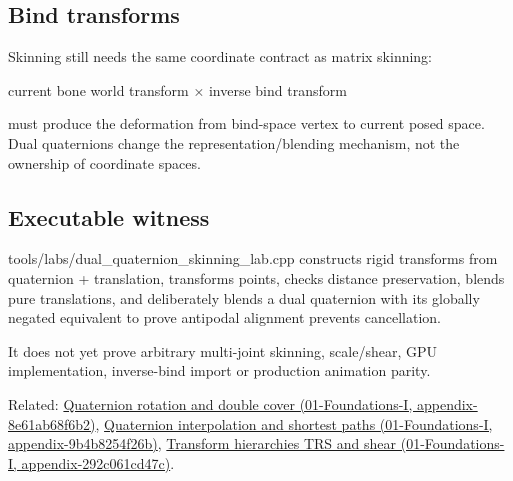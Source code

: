 \subsection{Bind transforms}\label{appendix-921f3f2efb53-bind-transforms}

Skinning still needs the same coordinate contract as matrix skinning:

current bone world transform × inverse bind transform

must produce the deformation from bind-space vertex to current posed space. Dual quaternions change the representation/blending mechanism, not the ownership of coordinate spaces.

\subsection{Executable witness}\label{appendix-921f3f2efb53-executable-witness}

tools/labs/dual\_quaternion\_skinning\_lab.cpp constructs rigid transforms from quaternion + translation, transforms points, checks distance preservation, blends pure translations, and deliberately blends a dual quaternion with its globally negated equivalent to prove antipodal alignment prevents cancellation.

It does not yet prove arbitrary multi-joint skinning, scale/shear, GPU implementation, inverse-bind import or production animation parity.

Related: \href{../01-Foundations-I/main.pdf\#nameddest=appendix-8e61ab68f6b2}{Quaternion rotation and double cover (01-Foundations-I, appendix-8e61ab68f6b2)}, \href{../01-Foundations-I/main.pdf\#nameddest=appendix-9b4b8254f26b}{Quaternion interpolation and shortest paths (01-Foundations-I, appendix-9b4b8254f26b)}, \href{../01-Foundations-I/main.pdf\#nameddest=appendix-292c061cd47c}{Transform hierarchies TRS and shear (01-Foundations-I, appendix-292c061cd47c)}.
